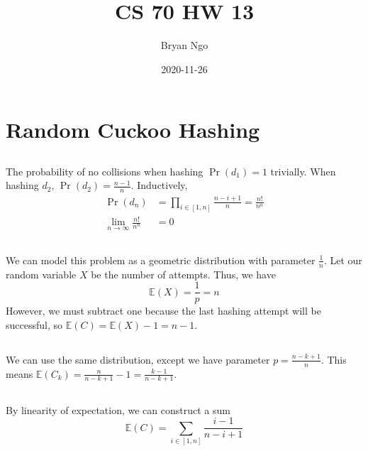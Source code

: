 \documentclass{article}
\title{CS 70 HW 13}
\author{Bryan Ngo}
\date{2020-11-26}
\newcommand{\E}{\mathbb{E}}
\begin{document}
\maketitle

\section{Random Cuckoo Hashing}

\subsection{}

The probability of no collisions when hashing \(\Pr(d_1) = 1\) trivially.
When hashing \(d_2\), \(\Pr(d_2) = \frac{n - 1}{n}\).
Inductively,
\begin{align}
    \Pr(d_n) &= \prod_{i \in [1, n]} \frac{n - i + 1}{n} = \frac{n!}{n^n} \\
    \lim_{n \to \infty} \frac{n!}{n^n} &= 0
\end{align}

\subsection{}

We can model this problem as a geometric distribution with parameter \(\frac{1}{n}\).
Let our random variable \(X\) be the number of attempts.
Thus, we have
\begin{equation}
    \E(X) = \frac{1}{p} = n
\end{equation}
However, we must subtract one because the last hashing attempt will be successful, so \(\E(C) = \E(X) - 1 = n - 1\).

\subsection{}

We can use the same distribution, except we have parameter \(p = \frac{n - k + 1}{n}\).
This means \(\E(C_k) = \frac{n}{n - k + 1} - 1 = \frac{k - 1}{n - k + 1}\).

\subsection{}

By linearity of expectation, we can construct a sum
\begin{equation}
    \E(C) = \sum_{i \in [1, n]} \frac{i - 1}{n - i + 1}
\end{equation}
\end{document}
